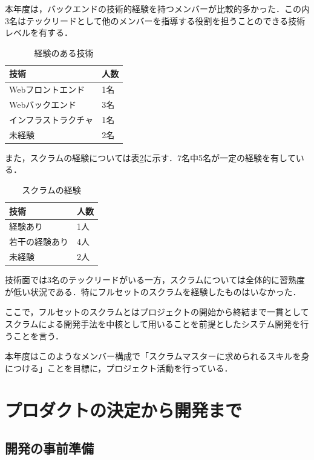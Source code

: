 \documentclass[fontsize=9pt, jafontscale=.95, twocolumn, a4paper]{jlreq}
\begin{document}
本年度は，バックエンドの技術的経験を持つメンバーが比較的多かった．この内3名はテックリードとして他のメンバーを指導する役割を担うことのできる技術レベルを有する．

\begin{table}[tb]
\caption{\label{tab:org97f5891}経験のある技術}
\centering
\begin{tabular}{ll}
技術 & 人数\\
\hline
Webフロントエンド & 1名\\
Webバックエンド & 3名\\
インフラストラクチャ & 1名\\
未経験 & 2名\\
\end{tabular}
\end{table}

また，スクラムの経験については表\ref{tab:org7cb6fee}に示す．7名中5名が一定の経験を有している．

\begin{table}[tb]
\caption{\label{tab:org7cb6fee}スクラムの経験}
\centering
\begin{tabular}{ll}
技術 & 人数\\
\hline
経験あり & 1人\\
若干の経験あり & 4人\\
未経験 & 2人\\
\end{tabular}
\end{table}

技術面では3名のテックリードがいる一方，スクラムについては全体的に習熟度が低い状況である．特にフルセットのスクラムを経験したものはいなかった．

ここで，フルセットのスクラムとはプロジェクトの開始から終結まで一貫としてスクラムによる開発手法を中核として用いることを前提としたシステム開発を行うことを言う．

本年度はこのようなメンバー構成で「スクラムマスターに求められるスキルを身につける」ことを目標に，プロジェクト活動を行っている．

\section{プロダクトの決定から開発まで}
\label{sec:org464a68f}

\subsection{開発の事前準備}
\label{sec:org91b6723}
\end{document}
